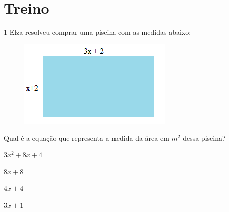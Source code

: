 \pagebreak

\section{Treino}

\num{1} Elza resolveu comprar uma piscina com as medidas abaixo:

\begin{figure}[H]
\centering\includegraphics[width=2.9625in,height=1.67014in]{./imgSAEB_8_MAT/media/image6.png}
\end{figure}

Qual é a equação que representa a medida da área em $m^2$ dessa piscina?

\begin{escolha}
\item $3x^2 + $$8x + 4$ 
\item $8x + 8$
\item $4x + 4$
\item $3x + 1$
\end{escolha}











